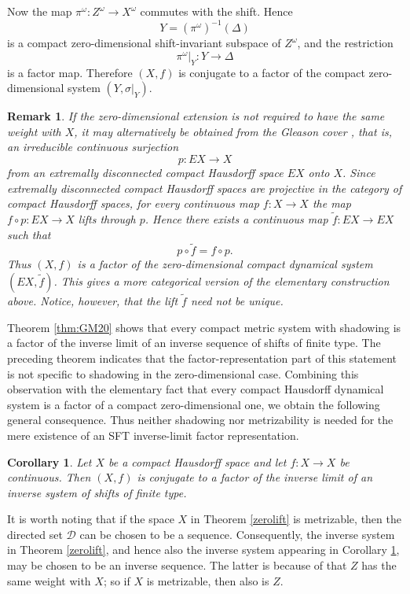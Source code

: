 \documentclass[10pt,a4paper]{amsart}
\newtheorem{corollary}[theorem]{Corollary}
\numberwithin{equation}{section}
\newtheorem{remark}[theorem]{Remark}
\begin{document}
Now the map $\pi^\omega:Z^\omega\to X^\omega$ commutes with the shift. Hence
\[
    Y=(\pi^\omega)^{-1}(\Delta)
\]
is a compact zero-dimensional shift-invariant subspace of $Z^\omega$, and the
restriction
\[
    \pi^\omega|_Y:Y\to\Delta
\]
is a factor map. Therefore $(X,f)$ is conjugate to a factor of the compact
zero-dimensional system $(Y,\sigma|_Y)$.


\begin{remark}
If the zero-dimensional extension is not required to have the same weight with $X$, it may alternatively be obtained from the Gleason cover \cite{Gleason,Johnstone}, that is, an irreducible continuous surjection
\[
    p:EX\to X
\]
from an extremally disconnected compact Hausdorff space $EX$ onto $X$. Since extremally disconnected compact Hausdorff spaces are
projective in the category of compact Hausdorff spaces, for every continuous map
$f:X\to X$ the map $f\circ p:EX\to X$ lifts through $p$. Hence there exists a
continuous map $\widetilde f:EX\to EX$ such that
\[
    p\circ \widetilde f=f\circ p.
\]
Thus $(X,f)$ is a factor of the zero-dimensional compact dynamical system
$(EX,\widetilde f)$. This gives a more categorical version of the elementary
construction above. Notice, however, that the lift $\widetilde f$ need not be
unique.
\end{remark}


Theorem \ref{thm:GM20} shows that every compact metric system with shadowing is
a factor of the inverse limit of an inverse sequence of shifts of finite type.
The preceding theorem indicates that the factor-representation part of this
statement is not specific to shadowing in the zero-dimensional case. Combining
this observation with the elementary fact that every compact Hausdorff
dynamical system is a factor of a compact zero-dimensional one, we obtain the
following general consequence. Thus neither shadowing nor metrizability is
needed for the mere existence of an SFT inverse-limit factor representation.


\begin{corollary}\label{coro:fac}
Let $X$ be a compact Hausdorff space and let $f:X\to X$ be continuous. Then
$(X,f)$ is conjugate to a factor of the inverse limit of an inverse system of
shifts of finite type.
\end{corollary}

It is worth noting that if the space $X$ in Theorem \ref{zerolift} is metrizable, then the directed set
$\mathcal D$ can be chosen to be a sequence.
Consequently, the inverse system in Theorem \ref{zerolift}, and hence also the
inverse system appearing in Corollary \ref{coro:fac}, may be chosen to be an
inverse sequence. The latter is because of that $Z$ has the same weight with $X$; so if $X$ is metrizable, then also is $Z$.
\end{document}
